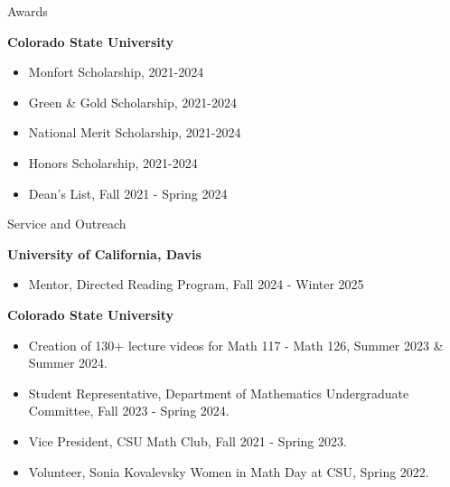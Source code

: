 \documentclass[
	11pt, %
]{resume} %
\begin{document}

\begin{rSection}{Awards} %


	\textbf{Colorado State University}
	\begin{itemize}
		\item{Monfort Scholarship, 2021-2024}
		\item{Green \& Gold Scholarship, 2021-2024}
		\item{National Merit Scholarship, 2021-2024}
		\item{Honors Scholarship, 2021-2024}
		\item{Dean's List, Fall 2021 - Spring 2024}\\
	\end{itemize}
	
\end{rSection}


\begin{rSection}{Service and Outreach}

	\textbf{University of California, Davis}
	\begin{itemize}
		\item{Mentor, Directed Reading Program, Fall 2024 - Winter 2025}\\
	\end{itemize}
	\textbf{Colorado State University}
	\begin{itemize}
		\item{Creation of 130+ lecture videos for Math 117 - Math 126, Summer 2023 \& Summer 2024.}
		\item{Student Representative, Department of Mathematics Undergraduate Committee, Fall 2023 - Spring 2024.}
		\item{Vice President, CSU Math Club, Fall 2021 - Spring 2023.}
		\item{Volunteer, Sonia Kovalevsky Women in Math Day at CSU, Spring 2022.}\\
	\end{itemize}
	
\end{rSection}
\end{document}
